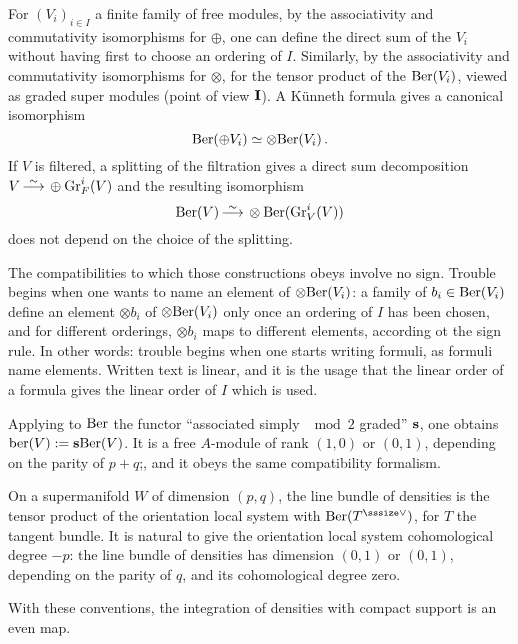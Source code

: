 For $(V_i)_{i\in I}$ a finite family of free modules, by
the associativity and commutativity isomorphisms for
$\oplus$, one can define the direct sum of the $V_i$
without having first to choose an ordering of $I$.
Similarly, by the associativity and commutativity
isomorphisms for $\otimes$, for the tensor product of
the $\text{\rm Ber}(V_i)$, viewed as graded super modules (point
of view $\text{\bf I}$). 
A K\"unneth formula gives a canonical isomorphism
$$
\text{\rm Ber}(\oplus V_i)\simeq \otimes\text{\rm Ber}(V_i)\,.
$$
If $V$ is filtered, a splitting of the filtration gives
a direct sum decomposition $V\arrowsim \oplus \text{Gr}_F^i
(V)$ and the resulting isomorphism
$$
\Ber(V)\arrowsim \otimes \Ber(\text{Gr}_V^i(V))
$$
does not depend on the choice of the splitting.

The compatibilities to which those constructions obeys
involve no sign.
Trouble begins when one wants to name an element of
$\otimes\text{\rm Ber}(V_i)$: a family of $b_i\in \text{\rm Ber}(V_i)$
define an element $\otimes b_i$ of $\otimes\text{\rm Ber}(V_i)$
only once an ordering of $I$ has been chosen, and for
different orderings, $\otimes b_i$ maps to different
elements, according ot the sign rule.
In other words: trouble begins when one starts writing
formuli, as formuli name elements.
Written text is linear, and it is the usage that the
linear order of a formula gives the linear order of $I$
which is used.

Applying to $\text{\rm Ber}$ the functor ``associated simply $\mod
2$ graded'' $\bold{s}$, one obtains\break
 $\text{\rm ber}(V):=\bold{s} \text{\rm Ber}(V)$.
It is a free $A$-module of rank $(1,0)$ or $(0,1)$,
depending on the parity of $p+q$;, and it obeys the same
compatibility formalism.

On a supermanifold $W$ of dimension $(p,q)$, the line
bundle of densities is the tensor product of the
orientation local system with $\Ber(T^{\upvee})$, for
$T$ the tangent bundle.
It is natural to give the orientation local system
cohomological degree $-p$: the line bundle of densities
has dimension $(0,1)$ or $(0,1)$, depending on the
parity of $q$, and its cohomological degree zero.

With these conventions, the integration of densities with
compact support is an even map.
\endexample




\enddocument



